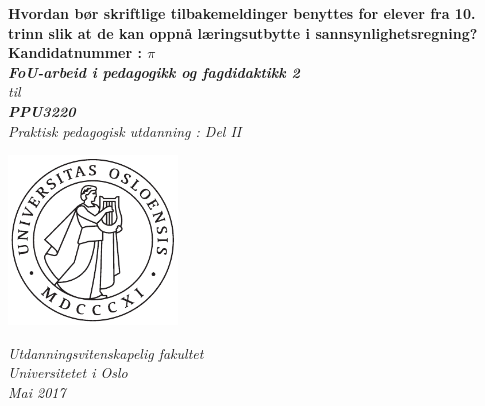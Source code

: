 \documentclass[main.tex]{subfiles}
\begin{document}
\thispagestyle{empty}
\begin{center}        %
  \vspace{5mm}        %
  \LARGE
  \textbf{Hvordan bør skriftlige tilbakemeldinger benyttes for elever fra 10. trinn 
  slik at de kan oppnå læringsutbytte i sannsynlighetsregning?} \\
  \Large
  \vspace{10mm}
  \large
  \textbf{Kandidatnummer : $\pi$} \\
  \vspace{20mm}
  \Large
  {\bf{\textsl{FoU-arbeid i pedagogikk og fagdidaktikk 2}}} \\
  \textsl{til} \\
  \vspace{2mm}
  {\bf{\textsl{PPU3220}}} \\
  \vspace{5mm}
  {\large \textsl {Praktisk pedagogisk utdanning : Del II}}\\
  \vspace{10mm}
  \centerline{\includegraphics[width=45mm,height=45mm]{../figures/uiosegl.pdf}} 
  \vspace{8mm}
  \textsl{Utdanningsvitenskapelig fakultet} \\
  \textsl{Universitetet i Oslo} \\
  \vspace{5mm}
  \large
  \textsl{Mai 2017} \\
  \vspace{2cm}


\end{center}
\end{document}
